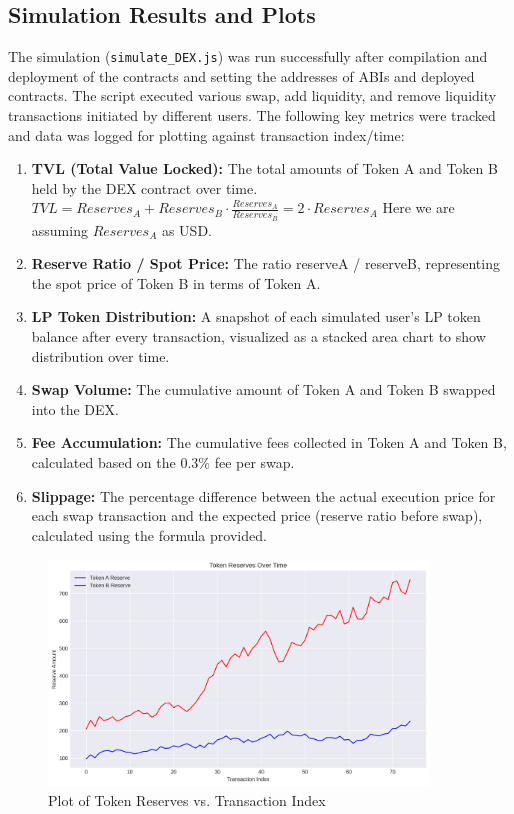 \documentclass[12pt]{article}
\begin{document}
\subsection{Simulation Results and Plots}
The simulation (\texttt{simulate\_DEX.js}) was run successfully after compilation and deployment of the contracts and setting the addresses of ABIs and deployed contracts. The script executed various swap, add liquidity, and remove liquidity transactions initiated by different users.
The following key metrics were tracked and data was logged for plotting against transaction index/time:
\begin{enumerate}
    \item \textbf{TVL (Total Value Locked):} The total amounts of Token A and Token B held by the DEX contract over time. \(TVL = Reserves_A + Reserves_B \cdot \frac{Reserves_A}{Reserves_B} = 2 \cdot Reserves_A\) Here we are assuming \(Reserves_A\) as USD.
    \item \textbf{Reserve Ratio / Spot Price:} The ratio reserveA / reserveB, representing the spot price of Token B in terms of Token A.
    \item \textbf{LP Token Distribution:} A snapshot of each simulated user's LP token balance after every transaction, visualized as a stacked area chart to show distribution over time.
    \item \textbf{Swap Volume:} The cumulative amount of Token A and Token B swapped into the DEX.
    \item \textbf{Fee Accumulation:} The cumulative fees collected in Token A and Token B, calculated based on the 0.3\% fee per swap.
    \item \textbf{Slippage:} The percentage difference between the actual execution price for each swap transaction and the expected price (reserve ratio before swap), calculated using the formula provided.
\end{enumerate}
\begin{figure}[H]
    \centering
    \includegraphics[width=0.9\textwidth]{../task2_plots/reserves.png}
    \caption{Plot of Token Reserves vs. Transaction Index}
    \label{fig:reserves}
\end{figure}
\end{document}
